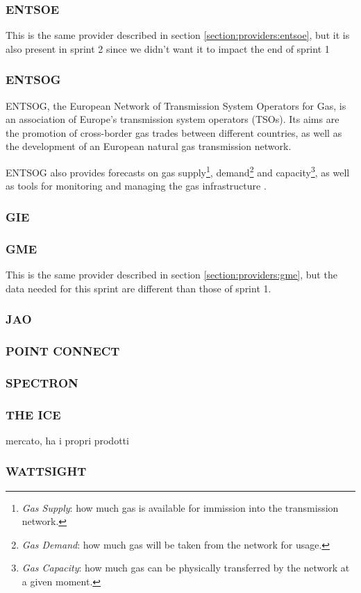 
\subsubsection{ENTSOE}
    This is the same provider described in section \ref{section:providers:entsoe}, but it is also present in sprint 2 since we didn't want it to impact the end of sprint 1
\subsubsection{ENTSOG}
    ENTSOG, the European Network of Transmission System Operators for Gas, is an association of Europe's transmission system operators (TSOs).
    Its aims are the promotion of cross-border gas trades between different countries, as well as the development of an European natural gas transmission network.
    
    ENTSOG also provides forecasts on gas supply\footnote{\textit{Gas Supply}: how much gas is available for immission into the transmission network.}, demand\footnote{\textit{Gas Demand}: how much gas will be taken from the network for usage.} and capacity\footnote{\textit{Gas Capacity}: how much gas can be physically transferred by the network at a given moment.}, as well as tools for monitoring and managing the gas infrastructure \cite{bib:wikipedia:entsog, bib:entsog:mission}.
\subsubsection{GIE}
\subsubsection{GME}
    This is the same provider described in section \ref{section:providers:gme}, but the data needed for this sprint are different than those of sprint 1.
\subsubsection{JAO}
\subsubsection{POINT CONNECT}
\subsubsection{SPECTRON}
\subsubsection{THE ICE}
    mercato, ha i propri prodotti
\subsubsection{WATTSIGHT}
